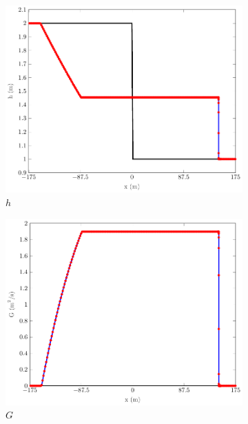 \documentclass[10pt]{elsarticle}
\begin{document}
\begin{figure}
	\centering
	\begin{subfigure}{0.32\textwidth}
		\centering
		\includegraphics[width=\textwidth]{./Figures/Simulations/Validation/DBSWWE/h.pdf}
		\caption{$h$}
	\end{subfigure}
	\begin{subfigure}{0.32\textwidth}
		\centering
		\includegraphics[width=\textwidth]{./Figures/Simulations/Validation/DBSWWE/G.pdf}
		\caption{$G$}
	\end{subfigure}
	\begin{subfigure}{0.32\textwidth}
		\centering

\end{subfigure}
\end{figure}
\end{document}
